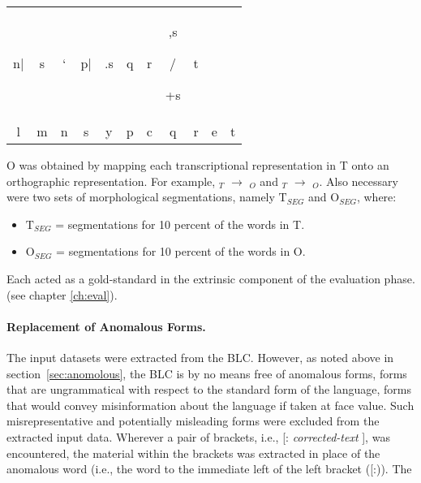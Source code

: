\begin{table}[ht]
\begin{tabular}{c c c c c c c c c c c}
           \begin{cjhebrew}n|\end{cjhebrew} & \begin{cjhebrew}s\end{cjhebrew} & \begin{cjhebrew}`\end{cjhebrew} 
           & \begin{cjhebrew}p|\end{cjhebrew} & \begin{cjhebrew}.s\end{cjhebrew} & \begin{cjhebrew}q\end{cjhebrew} & \begin{cjhebrew}r\end{cjhebrew} & \begin{cjhebrew},s\end{cjhebrew}/\begin{cjhebrew}+s\end{cjhebrew} & \begin{cjhebrew}t\end{cjhebrew} \\
	  l & m & n & s & y & p & c & q & r & e & t \\
\hline
\end{tabular}
\end{table}
O was obtained by mapping each transcriptional representation 
in T onto an orthographic representation. For example, $_T$ $\to$
$_O$ and $_T$ $\to$ $_O$.
Also necessary were two sets of morphological segmentations, namely $\text{T}_{SEG}$ and $\text{O}_{SEG}$, where:
\begin{itemize}
\item $\text{T}_{SEG}$ = segmentations for 10 percent of the words in T.
\item  $\text{O}_{SEG}$ = segmentations for 10 percent of the words in O.
\end{itemize} 
Each acted as a gold-standard in the extrinsic 
component of the evaluation phase. (see chapter \ref{ch:eval}).  

\paragraph{Replacement of Anomalous Forms.} 
The input datasets were extracted from the \ac{BLC}. However, as noted above in 
section~\ref{sec:anomolous}, the \ac{BLC} is by no means free of anomalous forms, 
forms that are ungrammatical with respect to the standard form of the language, 
forms that would convey misinformation about the language if taken at face value. 
Such misrepresentative and potentially misleading forms were excluded from the 
extracted input data.  
Wherever a pair of brackets, i.e., \textsf{[: \textit{corrected-text} ]}, was encountered, 
the material within the brackets was extracted in place of the anomalous word (i.e., the 
word to the immediate left of the left bracket (\textsf{[:})). The 

